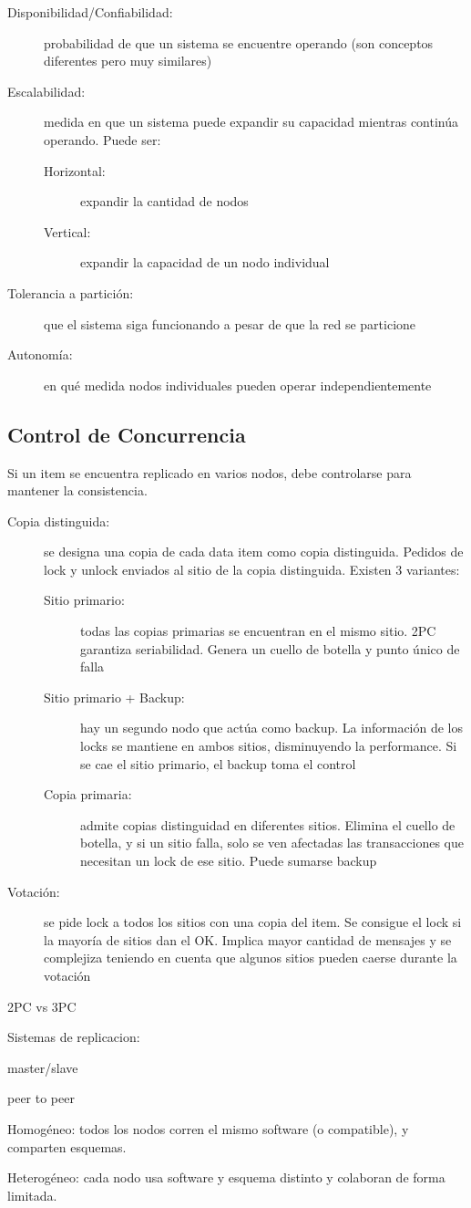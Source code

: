 \begin{description}
	\item[Disponibilidad/Confiabilidad:] probabilidad de que un sistema se encuentre operando (son conceptos diferentes pero muy similares)
	\item[Escalabilidad:] medida en que un sistema puede expandir su capacidad mientras continúa operando. Puede ser:
	\begin{description}
		\item[Horizontal:] expandir la cantidad de nodos
		\item[Vertical:] expandir la capacidad de un nodo individual
	\end{description}
	\item[Tolerancia a partición:] que el sistema siga funcionando a pesar de que la red se particione
	\item[Autonomía:] en qué medida nodos individuales pueden operar independientemente
\end{description}

\subsection{Control de Concurrencia}

Si un item se encuentra replicado en varios nodos, debe controlarse para mantener la consistencia.

\begin{description}
	\item[Copia distinguida:] se designa una copia de cada data item como copia distinguida. Pedidos de lock y unlock enviados al sitio de la copia distinguida. Existen 3 variantes:
	\begin{description}
		\item[Sitio primario:] todas las copias primarias se encuentran en el mismo sitio. 2PC garantiza seriabilidad. Genera un cuello de botella y punto único de falla
		\item[Sitio primario + Backup:] hay un segundo nodo que actúa como backup. La información de los locks se mantiene en ambos sitios, disminuyendo la performance. Si se cae el sitio primario, el backup toma el control
		\item[Copia primaria:] admite copias distinguidad en diferentes sitios. Elimina el cuello de botella, y si un sitio falla, solo se ven afectadas las transacciones que necesitan un lock de ese sitio. Puede sumarse backup
	\end{description}
	\item[Votación:] se pide lock a todos los sitios con una copia del item. Se consigue el lock si la mayoría de sitios dan el OK. Implica mayor cantidad de mensajes y se complejiza teniendo en cuenta que algunos sitios pueden caerse durante la votación
\end{description}

2PC vs 3PC

Sistemas de replicacion:

master/slave

peer to peer

Homogéneo: todos los nodos corren el mismo software (o compatible), y comparten esquemas.

Heterogéneo: cada nodo usa software y esquema distinto y colaboran de forma limitada.
